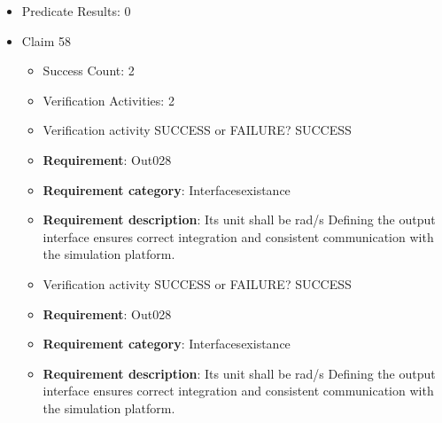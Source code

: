 \documentclass{article}
\begin{document}
\begin{itemize}
\begin{itemize}
						\item \textbf{Requirement}: Out027 
						\item \textbf{Requirement category}: Interfacesexistance 
						\item \textbf{Requirement description}: Its unit shall be rad/s Defining the output interface ensures correct integration and consistent communication with the simulation platform.
					
					\item Verification activity SUCCESS or FAILURE? SUCCESS
		
						\item \textbf{Requirement}: Out027 
						\item \textbf{Requirement category}: Interfacesexistance 
						\item \textbf{Requirement description}: Its unit shall be rad/s Defining the output interface ensures correct integration and consistent communication with the simulation platform.
					
				\end{itemize}
				
									    
				\item Predicate Results: 0

  				  \item Claim 58
				\begin{itemize}
			    	\item Success Count: 2 
			    	\item Verification Activities: 2
					\item Verification activity SUCCESS or FAILURE? SUCCESS
		
						\item \textbf{Requirement}: Out028 
						\item \textbf{Requirement category}: Interfacesexistance 
						\item \textbf{Requirement description}: Its unit shall be rad/s Defining the output interface ensures correct integration and consistent communication with the simulation platform.
					
					\item Verification activity SUCCESS or FAILURE? SUCCESS
		
						\item \textbf{Requirement}: Out028 
						\item \textbf{Requirement category}: Interfacesexistance 
						\item \textbf{Requirement description}: Its unit shall be rad/s Defining the output interface ensures correct integration and consistent communication with the simulation platform.
					

\end{itemize}
\end{itemize}
\end{document}
